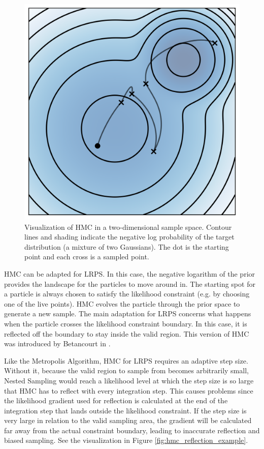 \documentclass[12pt, a4paper]{report}
\begin{document}
\begin{figure}
    \centering
    \includegraphics[scale=0.8]{figs/hmc_example.png}
    \caption{Visualization of HMC in a two-dimensional sample space. Contour lines and shading indicate the negative log probability of the target distribution (a mixture of two Gaussians). The dot is the starting point and each cross is a sampled point.}
    \label{fig:hmc_example}
\end{figure}

HMC can be adapted for LRPS.
In this case, the negative logarithm of the prior provides the landscape for the particles to move around in.
The starting spot for a particle is always chosen to satisfy the likelihood constraint (e.g. by choosing one of the live points).
HMC evolves the particle through the prior space to generate a new sample.
The main adaptation for LRPS concerns what happens when the particle crosses the likelihood constraint boundary.
In this case, it is reflected off the boundary to stay inside the valid region.
This version of HMC was introduced by Betancourt in \cite{hmc_in_ns}.

Like the Metropolis Algorithm, HMC for LRPS requires an adaptive step size.
Without it, because the valid region to sample from becomes arbitrarily small, Nested Sampling would reach a likelihood level at which the step size is so large that HMC has to reflect with every integration step.
This causes problems since the likelihood gradient used for reflection is calculated at the end of the integration step that lands outside the likelihood constraint.
If the step size is very large in relation to the valid sampling area, the gradient will be calculated far away from the actual constraint boundary, leading to inaccurate reflection and biased sampling.
See the visualization in Figure \ref{fig:hmc_reflection_example}.
\end{document}
